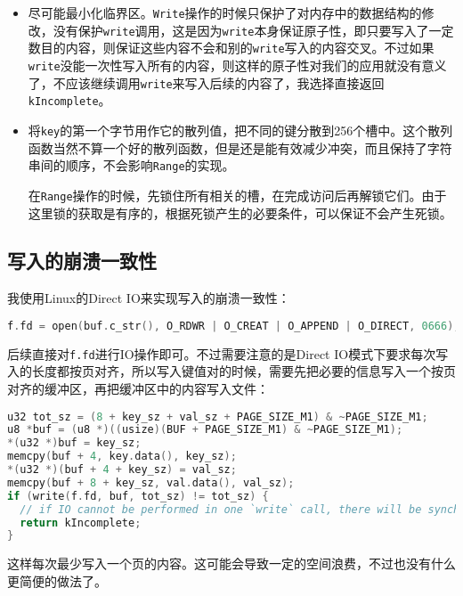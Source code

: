 \documentclass[12pt, UTF8]{article}
\begin{document}
\begin{itemize}
  \item 尽可能最小化临界区。\lstinline|Write|操作的时候只保护了对内存中的数据结构的修改，没有保护\lstinline|write|调用，这是因为\lstinline|write|本身保证原子性，即只要写入了一定数目的内容，则保证这些内容不会和别的\lstinline|write|写入的内容交叉。不过如果\lstinline|write|没能一次性写入所有的内容，则这样的原子性对我们的应用就没有意义了，不应该继续调用\lstinline|write|来写入后续的内容了，我选择直接返回\lstinline|kIncomplete|。
  \item 将\lstinline|key|的第一个字节用作它的散列值，把不同的键分散到256个槽中。这个散列函数当然不算一个好的散列函数，但是还是能有效减少冲突，而且保持了字符串间的顺序，不会影响\lstinline|Range|的实现。
  
  在\lstinline|Range|操作的时候，先锁住所有相关的槽，在完成访问后再解锁它们。由于这里锁的获取是有序的，根据死锁产生的必要条件，可以保证不会产生死锁。
\end{itemize}

\subsection{写入的崩溃一致性}

我使用Linux的Direct IO来实现写入的崩溃一致性：

\begin{lstlisting}[language = C++, ndkeywords = {open}]
f.fd = open(buf.c_str(), O_RDWR | O_CREAT | O_APPEND | O_DIRECT, 0666);
\end{lstlisting}

后续直接对\lstinline|f.fd|进行IO操作即可。不过需要注意的是Direct IO模式下要求每次写入的长度都按页对齐，所以写入键值对的时候，需要先把必要的信息写入一个按页对齐的缓冲区，再把缓冲区中的内容写入文件：

\begin{lstlisting}[language = C++, morekeywords = { u8, u32, usize }, ndkeywords = { memcpy, write }]
u32 tot_sz = (8 + key_sz + val_sz + PAGE_SIZE_M1) & ~PAGE_SIZE_M1;
u8 *buf = (u8 *)((usize)(BUF + PAGE_SIZE_M1) & ~PAGE_SIZE_M1);
*(u32 *)buf = key_sz;
memcpy(buf + 4, key.data(), key_sz);
*(u32 *)(buf + 4 + key_sz) = val_sz;
memcpy(buf + 8 + key_sz, val.data(), val_sz);
if (write(f.fd, buf, tot_sz) != tot_sz) {
  // if IO cannot be performed in one `write` call, there will be synchronization problems
  return kIncomplete;
}
\end{lstlisting}

这样每次最少写入一个页的内容。这可能会导致一定的空间浪费，不过也没有什么更简便的做法了。
\end{document}
